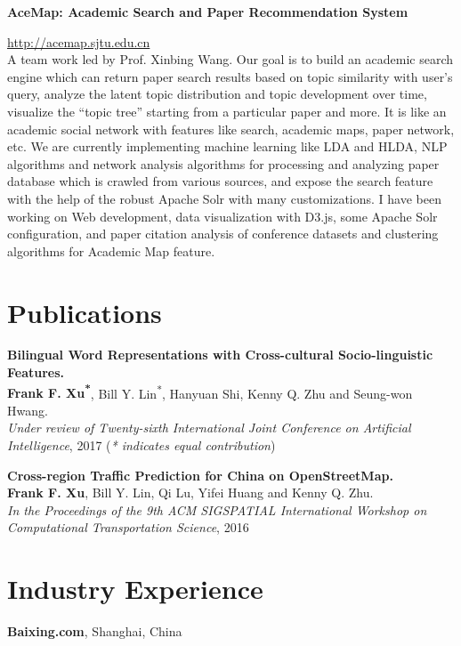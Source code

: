 \documentclass[margin,line]{res}
\begin{document}
\begin{resume}
{\bf AceMap: Academic Search and Paper Recommendation System}

\vspace{-.3cm}
\url{http://acemap.sjtu.edu.cn}\\
A team work led by Prof. Xinbing Wang. Our goal is to build an academic search engine which can return paper search results based on topic similarity with user's query, analyze the latent topic distribution and topic development over time, visualize the ``topic tree'' starting from a particular paper and more. It is like an academic social network with features like search, academic maps, paper network, etc. We are currently implementing machine learning like LDA and HLDA, NLP algorithms and network analysis algorithms for processing and analyzing paper database which is crawled from various sources, and expose the search feature with the help of the robust Apache Solr with many customizations. I have been working on Web development, data visualization with D3.js, some Apache Solr configuration, and paper citation analysis of conference datasets and clustering algorithms for Academic Map feature.


\section{\sc Publications}
\textbf{Bilingual Word Representations with Cross-cultural Socio-linguistic Features.}\\
\textbf{Frank F. Xu\textsuperscript{*}}, Bill Y. Lin\textsuperscript{*}, Hanyuan Shi, Kenny Q. Zhu and Seung-won Hwang.\\
\textit{Under review of Twenty-sixth International Joint Conference on Artificial Intelligence}, 2017 (\textit{* indicates equal contribution})

\textbf{Cross-region Traffic Prediction for China on OpenStreetMap.}\\
\textbf{Frank F. Xu}, Bill Y. Lin, Qi Lu, Yifei Huang and Kenny Q. Zhu.\\
\textit{In the Proceedings of the 9th ACM SIGSPATIAL International Workshop on Computational Transportation Science}, 2016

%
%
\section{\sc Industry Experience}
{\bf Baixing.com}, Shanghai, China


\end{resume}
\end{document}
